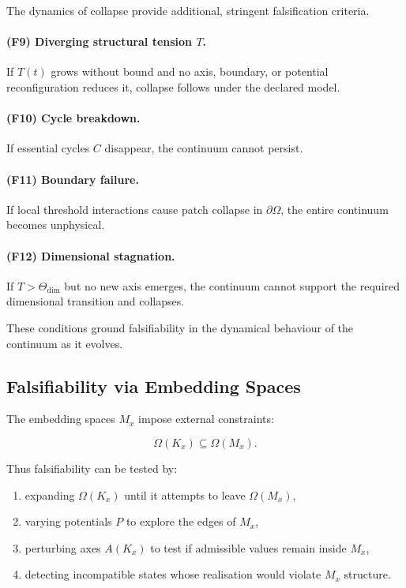 The dynamics of collapse provide additional, stringent falsification
criteria.

\paragraph{(F9) Diverging structural tension \texorpdfstring{$T$}{T}.}  
If $T(t)$ grows without bound and no axis, boundary, or potential
reconfiguration reduces it, collapse follows under the declared model.

\paragraph{(F10) Cycle breakdown.}  
If essential cycles $C$ disappear, the continuum cannot persist.

\paragraph{(F11) Boundary failure.}  
If local threshold interactions cause patch collapse in $\partial\Omega$,
the entire continuum becomes unphysical.

\paragraph{(F12) Dimensional stagnation.}  
If $T > \Theta_{\mathrm{dim}}$ but no new axis emerges, the continuum
cannot support the required dimensional transition and collapses.

These conditions ground falsifiability in the dynamical behaviour of
the continuum as it evolves.



\subsection{Falsifiability via Embedding Spaces}

The embedding spaces $M_x$ impose external constraints:

\[
\Omega(K_x) \subseteq \Omega(M_x).
\]

Thus falsifiability can be tested by:

\begin{enumerate}
    \item expanding $\Omega(K_x)$ until it attempts to leave 
          $\Omega(M_x)$,
    \item varying potentials $P$ to explore the edges of $M_x$,
    \item perturbing axes $A(K_x)$ to test if admissible values remain
          inside $M_x$,
    \item detecting incompatible states whose realisation would violate
          $M_x$ structure.
\end{enumerate}

